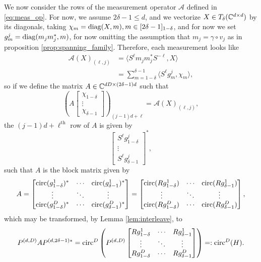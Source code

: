 We now consider the rows of the measurement operator $\mathcal{A}$ defined in \eqref{eq:meas_op}.  For now, we assume $2 \delta - 1 \le d$, and we vectorize $X \in T_\delta(\mathbb{C}^{d \times d})$ by its diagonals, taking $\chi_m = \operatorname{diag}(X, m), m \in [2 \delta - 1]_{1 - \delta}$, and for now we set $g_m^{j} = \operatorname{diag}(m_j m_j^*, m)$, for now omitting the assumption that $m_j = \gamma \circ v_j$ as in proposition \ref{prop:spanning_family}.  Therefore, each measurement looks like \begin{align*} \mathcal{A}(X)_{(\ell, j)} &= \langle S^{\ell} m_j m_j^* S^{-\ell}, X \rangle \\ &= \sum_{m = 1 - \delta}^{\delta - 1} \langle S^{\ell} g_m^j, \chi_m \rangle,\end{align*} so if we define the matrix $A \in \mathbb{C}^{dD \times (2 \delta - 1)d}$ such that \begin{equation}\left(A \begin{bmatrix} \chi_{1 - \delta} \\ \vdots \\ \chi_{\delta - 1} \end{bmatrix}\right)_{(j-1) d + \ell} = \mathcal{A}(X)_{(\ell, j)}, \label{eq:vectorized_meas}\end{equation} the $(j - 1) d + \ell^{\text{th}}$ row of $A$ is given by \[\begin{bmatrix} S^{\ell} g_{1 - \delta}^j \\ \vdots \\ S^{\ell} g_{\delta - 1}^j \end{bmatrix}^*,\] such that $A$ is the block matrix given by \[A = \begin{bmatrix} \operatorname{circ}(g_{1 - \delta}^1)^* & \cdots & \operatorname{circ}(g_{\delta - 1}^1)^* \\ \vdots & \ddots & \vdots \\ \operatorname{circ}(g_{1 - \delta}^D)^* & \cdots & \operatorname{circ}(g_{\delta - 1}^D)^* \end{bmatrix} = \begin{bmatrix} \operatorname{circ}(R g_{1 - \delta}^1) & \cdots & \operatorname{circ}(R g_{\delta - 1}^1) \\ \vdots & \ddots & \vdots \\ \operatorname{circ}(R g_{1 - \delta}^D) & \cdots & \operatorname{circ}(R g_{\delta - 1}^D) \end{bmatrix},\]  which may be transformed, by Lemma \ref{lem:interleave}, to \begin{equation}P^{(d, D)} A P^{(d, 2 \delta - 1)*} = \operatorname{circ}^D\left(P^{(d, D)} \begin{bmatrix} R g_{1 - \delta}^1 & \cdots & R g_{\delta - 1}^1 \\ \vdots & \ddots & \vdots \\ R g_{1 - \delta}^D & \cdots & R g_{\delta - 1}^D \end{bmatrix}\right) =: \operatorname{circ}^D(H). \label{eq:interleaved_meas}\end{equation}

